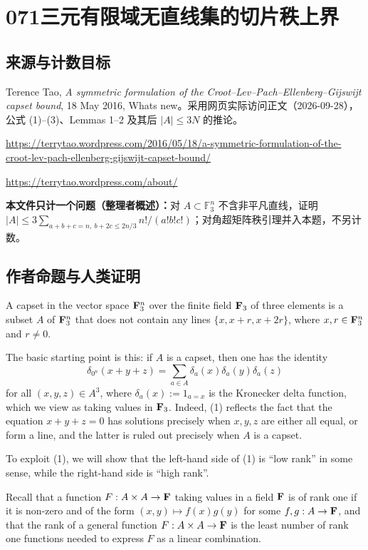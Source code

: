 \documentclass[UTF8,11pt]{ctexart}
\theoremstyle{definition}
\begin{document}
\section*{071\quad 三元有限域无直线集的切片秩上界}
\subsection*{来源与计数目标}
Terence Tao, \emph{A symmetric formulation of the Croot--Lev--Pach--Ellenberg--Gijswijt capset bound}, 18 May 2016, What\textquotesingle s new。采用网页实际访问正文（2026-09-28），公式 (1)--(3)、Lemmas 1--2 及其后 $|A|\le3N$ 的推论。
\par\url{https://terrytao.wordpress.com/2016/05/18/a-symmetric-formulation-of-the-croot-lev-pach-ellenberg-gijswijt-capset-bound/}
\par\url{https://terrytao.wordpress.com/about/}
\par\textbf{本文件只计一个问题（整理者概述）：}对 $A\subset\mathbb F_3^n$ 不含非平凡直线，证明 $|A|\le3\sum_{a+b+c=n,\ b+2c\le2n/3}n!/(a!b!c!)$；对角超矩阵秩引理并入本题，不另计数。
\subsection*{作者命题与人类证明}

A capset in the vector space ${\bf F}_3^n$ over the finite field ${\bf F}_3$ of three elements is a subset $A$ of ${\bf F}_3^n$ that does not contain any lines $\{x,x+r,x+2r\}$, where $x,r\in{\bf F}_3^n$ and $r\ne0$.

The basic starting point is this: if $A$ is a capset, then one has the identity
\begin{equation}
\delta_{0^n}(x+y+z)=\sum_{a\in A}\delta_a(x)\delta_a(y)\delta_a(z)\tag{1}
\end{equation}
for all $(x,y,z)\in A^3$, where $\delta_a(x):=1_{a=x}$ is the Kronecker delta function, which we view as taking values in ${\bf F}_3$. Indeed, (1) reflects the fact that the equation $x+y+z=0$ has solutions precisely when $x,y,z$ are either all equal, or form a line, and the latter is ruled out precisely when $A$ is a capset.

To exploit (1), we will show that the left-hand side of (1) is ``low rank'' in some sense, while the right-hand side is ``high rank''.

Recall that a function $F:A\times A\to{\bf F}$ taking values in a field ${\bf F}$ is of rank one if it is non-zero and of the form $(x,y)\mapsto f(x)g(y)$ for some $f,g:A\to{\bf F}$, and that the rank of a general function $F:A\times A\to{\bf F}$ is the least number of rank one functions needed to express $F$ as a linear combination.
\end{document}
